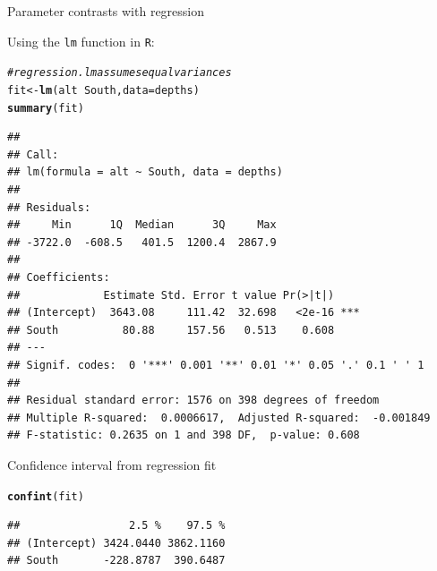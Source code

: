 \documentclass{beamer}\usepackage[]{graphicx}\usepackage[]{color}
\newcommand{\hlcom}[1]{\textcolor[rgb]{0.678,0.584,0.686}{\textit{#1}}}%
\newcommand{\hlopt}[1]{\textcolor[rgb]{0,0,0}{#1}}%
\newcommand{\hlstd}[1]{\textcolor[rgb]{0.345,0.345,0.345}{#1}}%
\newcommand{\hlkwb}[1]{\textcolor[rgb]{0.69,0.353,0.396}{#1}}%
\newcommand{\hlkwc}[1]{\textcolor[rgb]{0.333,0.667,0.333}{#1}}%
\newcommand{\hlkwd}[1]{\textcolor[rgb]{0.737,0.353,0.396}{\textbf{#1}}}%
\newenvironment{knitrout}{}{} %
\begin{document}
\begin{frame}[fragile]{Parameter contrasts with regression}

Using the \texttt{lm} function in \texttt{R}:


\begin{knitrout}\scriptsize
{}\color{fgcolor}
\begin{alltt}
\hlcom{# regression. lm assumes equal variances}
\hlstd{fit} \hlkwb{<-} \hlkwd{lm}\hlstd{(alt} \hlopt{~} \hlstd{South,} \hlkwc{data} \hlstd{= depths)}
\hlkwd{summary}\hlstd{(fit)}
\end{alltt}
\begin{verbatim}
## 
## Call:
## lm(formula = alt ~ South, data = depths)
## 
## Residuals:
##     Min      1Q  Median      3Q     Max 
## -3722.0  -608.5   401.5  1200.4  2867.9 
## 
## Coefficients:
##             Estimate Std. Error t value Pr(>|t|)    
## (Intercept)  3643.08     111.42  32.698   <2e-16 ***
## South          80.88     157.56   0.513    0.608    
## ---
## Signif. codes:  0 '***' 0.001 '**' 0.01 '*' 0.05 '.' 0.1 ' ' 1
## 
## Residual standard error: 1576 on 398 degrees of freedom
## Multiple R-squared:  0.0006617,	Adjusted R-squared:  -0.001849 
## F-statistic: 0.2635 on 1 and 398 DF,  p-value: 0.608
\end{verbatim}

\end{knitrout}


\end{frame}


\begin{frame}[fragile]{Confidence interval from regression fit}

\begin{knitrout}\scriptsize
{}\color{fgcolor}
\begin{alltt}
\hlkwd{confint}\hlstd{(fit)}
\end{alltt}
\begin{verbatim}
##                 2.5 %    97.5 %
## (Intercept) 3424.0440 3862.1160
## South       -228.8787  390.6487
\end{verbatim}

\end{knitrout}


\end{frame}
\end{document}
